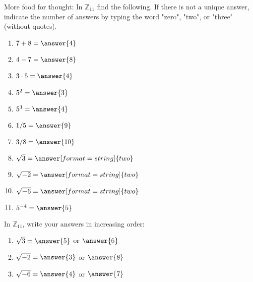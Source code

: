 \documentclass[space,nooutcomes,handout]{ximera}
\begin{document}
\begin{problem}
More food for thought:  In $\mathbb{Z}_{11}$ find the following.  If there is not a unique answer, indicate the number of answers by typing the word "zero", "two", or "three" (without quotes). 
\begin{enumerate}
\item $7 + 8 =\answer{4}$
\item $4 - 7 =\answer{8}$
\item $3\cdot 5 =\answer{4}$
\item $5^2 =\answer{3}$
\item $5^3 =\answer{4}$ 
\item $1/5 =\answer{9}$
\item $3/8 =\answer{10}$ 
\item $\sqrt{3} =\answer[format=string]{two}$ %
\item $\sqrt{-2} =\answer[format=string]{two}$  %
\item $\sqrt{-6} =\answer[format=string]{two}$  %
\item  $5^{-4}  =\answer{5}$ 
\end{enumerate}

\begin{problem}
In $\mathbb{Z}_{11}$, write your answers in increasing order: 
\begin{enumerate}
\item $\sqrt{3} =\answer{5}$ or $\answer{6}$ %
\item $\sqrt{-2} =\answer{3}$ or $\answer{8}$  %
\item $\sqrt{-6} =\answer{4}$ or $\answer{7}$  %
\end{enumerate}
\end{problem}
\end{problem}

\end{document}
